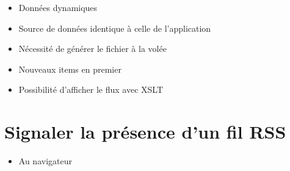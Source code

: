 \begin{itemize}
\tightlist
\item
  Données dynamiques
\item
  Source de données identique à celle de l'application
\item
  Nécessité de générer le fichier à la volée
\item
  Nouveaux items en premier
\item
  Possibilité d'afficher le flux avec XSLT
\end{itemize}

\hypertarget{signaler-la-pruxe9sence-dun-fil-rss}{%
\section{Signaler la présence d'un fil
RSS}\label{signaler-la-pruxe9sence-dun-fil-rss}}

\begin{itemize}
\tightlist
\item
  Au navigateur
\end{itemize}

\begin{otherlanguage}{english}

\begin{Shaded}
\begin{Highlighting}[]
\KeywordTok{>}
\end{Highlighting}
\end{Shaded}

\end{otherlanguage}


